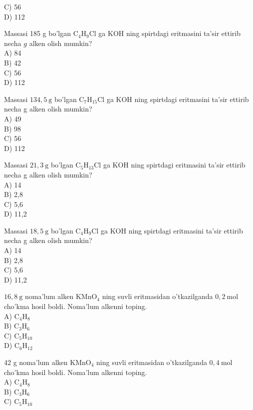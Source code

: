 C) 56\\
D) 112
  \item Massasi 185 g bo'lgan $\mathrm{C}_{4} \mathrm{H}_{9} \mathrm{Cl}$ ga KOH ning spirtdagi eritmasini ta'sir ettirib necha $g$ alken olish mumkin?\\
A) 84\\
B) 42\\
C) 56\\
D) 112
  \item Massasi $134,5 \mathrm{~g}$ bo'lgan $\mathrm{C}_{7} \mathrm{H}_{15} \mathrm{Cl}$ ga KOH ning spirtdagi eritmasini ta'sir ettirib necha g alken olish mumkin?\\
A) 49\\
B) 98\\
C) 56\\
D) 112
  \item Massasi $21,3 \mathrm{~g}$ bo'lgan $\mathrm{C}_{5} \mathrm{H}_{13} \mathrm{Cl}$ ga KOH ning spirtdagi eritmasini ta'sir ettirib necha g alken olish mumkin?\\
A) 14\\
B) 2,8\\
C) 5,6\\
D) 11,2
  \item Massasi $18,5 \mathrm{~g}$ bo'lgan $\mathrm{C}_{4} \mathrm{H}_{9} \mathrm{Cl}$ ga KOH ning spirtdagi eritmasini ta'sir ettirib necha g alken olish mumkin?\\
A) 14\\
B) 2,8\\
C) 5,6\\
D) 11,2
  \item $16,8 \mathrm{~g}$ noma'lum alken $\mathrm{KMnO}_{4}$ ning suvli eritmasidan o'tkazilganda $0,2 \mathrm{~mol}$ cho'kma hosil boldi. Noma'lum alkenni toping.\\
A) $\mathrm{C}_{4} \mathrm{H}_{8}$\\
B) $\mathrm{C}_{3} \mathrm{H}_{6}$\\
C) $\mathrm{C}_{5} \mathrm{H}_{10}$\\
D) $\mathrm{C}_{6} \mathrm{H}_{12}$
  \item 42 g noma'lum alken $\mathrm{KMnO}_{4}$ ning suvli eritmasidan o'tkazilganda $0,4 \mathrm{~mol}$ cho'kma hosil boldi. Noma'lum alkenni toping.\\
A) $\mathrm{C}_{4} \mathrm{H}_{8}$\\
B) $\mathrm{C}_{3} \mathrm{H}_{6}$\\
C) $\mathrm{C}_{5} \mathrm{H}_{10}$\\
